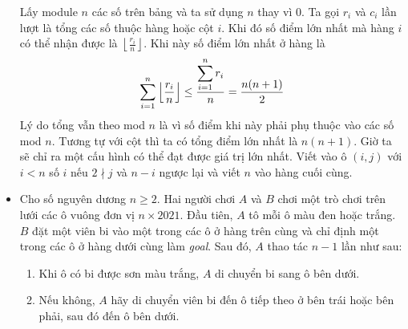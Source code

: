 \documentclass[11pt]{scrartcl}
\begin{document}
\begin{itemize}[label=, leftmargin=0em, itemsep=0.5em]
    \begin{sol}
        Lấy module $n$ các số trên bảng và ta sử dụng $n$ thay vì $0$. 
        Ta gọi $r_i$ và $c_i$ lần lượt là tổng các số thuộc hàng hoặc cột $i$. Khi đó số điểm lớn nhất mà hàng $i$ có thể nhận được là $\left\lfloor \frac{r_i}{n} \right\rfloor$. Khi này số điểm lớn nhất ở hàng là 
        \[
            \sum_{i = 1}^n \left\lfloor \frac{r_i}{n} \right\rfloor \leq \frac{\dsum_{i = 1}^n r_i}{n} = \frac{n(n + 1)}{2}
        \]
        Lý do tổng vẫn theo mod $n$ là vì số điểm khi này phải phụ thuộc vào các số mod $n$. Tương tự với cột thì ta có tổng điểm lớn nhất là $n(n +1)$. Giờ ta sẽ chỉ ra một cấu hình có thể đạt được giá trị lớn nhất. Viết vào ô $(i,j)$ với $i<n$ số $i$ nếu $2\nmid j$ và $n-i$ ngược lại và viết $n$ vào hàng cuối cùng.
    \end{sol}

    \item \begin{bt}
        Cho số nguyên dương $n \geq 2$. Hai người chơi $A$ và $B$ chơi một trò chơi trên lưới các ô vuông đơn vị $n \times 2021$. Đầu tiên, $A$ tô mỗi ô màu đen hoặc trắng. $B$ đặt một viên bi vào một trong các ô ở hàng trên cùng và chỉ định một trong các ô ở hàng dưới cùng làm \textit{goal}. Sau đó, $A$ thao tác $n - 1$ lần như sau:
        \begin{enumerate}
            \item Khi ô có bi được sơn màu trắng, $A$ di chuyển bi sang ô bên dưới.
            \item Nếu không, $A$ hãy di chuyển viên bi đến ô tiếp theo ở bên trái hoặc bên phải, sau đó đến ô bên dưới.
            
        \end{enumerate}
        

\end{bt}
\end{itemize}
\end{document}
